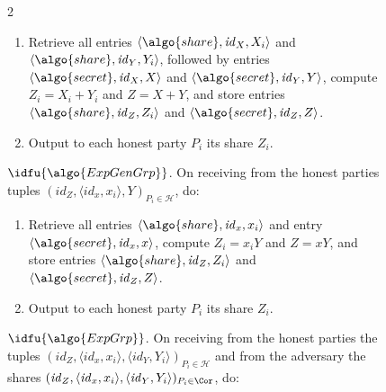 \begin{figure}
\begin{minipage}{1.1\textwidth}
\begin{framed}
\begin{multicols}{2}
          \begin{enumerate}

            \item Retrieve all entries $\langle \algo{share},
              \mathit{id}_{{X}}, {X}_i\rangle$ and $\langle \algo{share},
              \mathit{id}_{{Y}}, {Y}_i\rangle$, followed by entries $\langle
              \algo{secret}, \mathit{id}_{{X}}, {X}\rangle$ and $\langle
              \algo{secret}, \mathit{id}_{{Y}}, {Y}\rangle$, compute ${Z}_i =
              {X}_i+{Y}_i$ and ${Z} = {X}+{Y}$, and store entries $\langle
              \algo{share}, \mathit{id}_{{Z}}, {Z}_i\rangle$ and $\langle
              \algo{secret}, \mathit{id}_{{Z}}, {Z} \rangle$.

            \item Output to each honest party ${P}_i$ its share ${Z}_i$.

          \end{enumerate}

          {$\idfu{\algo{ExpGenGrp}}$.} On receiving from the honest parties
          tuples $(\mathit{id}_{{Z}}, \langle \mathit{id}_{x}, x_i\rangle,
          {Y})_{{P}_i \in \mathcal{H}}$, do:

          \begin{enumerate}

            \item Retrieve all entries $\langle \algo{share}, \mathit{id}_x,
              x_i\rangle$ and entry $\langle \algo{secret}, \mathit{id}_x,
              x\rangle$, compute ${Z}_i = x_i{Y}$ and ${Z} = x{Y}$, and store
              entries $\langle \algo{share}, \mathit{id}_{{Z}}, {Z}_i\rangle$
              and $\langle \algo{secret}, \mathit{id}_{{Z}}, {Z} \rangle$.

            \item Output to each honest party ${P}_i$ its share ${Z}_i$.

          \end{enumerate}

          {$\idfu{\algo{ExpGrp}}$.} On receiving from the honest parties the
          tuples $(\mathit{id}_{{Z}}, \langle \mathit{id}_x, x_i\rangle,
          \langle \mathit{id}_{{Y}},{Y}_i\rangle)_{{P}_i \in \mathcal{H}}$ and
          from the adversary the shares $(\mathit{id}_{{Z}}, \langle
          \mathit{id}_x, x_i \rangle, \langle \mathit{id}_{{Y}},
          {Y}_i\rangle)_{{P}_i \in \Cor}$, do:

          \begin{enumerate}


\end{enumerate}
\end{multicols}
\end{framed}
\end{minipage}
\end{figure}
